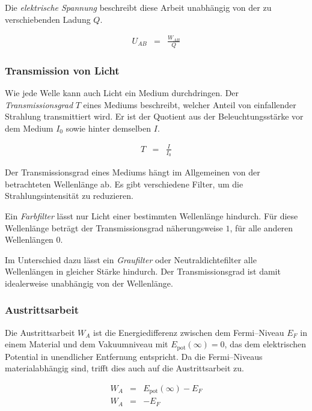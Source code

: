 \documentclass[12pt,a4paper]{scrartcl}
\numberwithin{equation}{section} %
\begin{document}
Die \emph{elektrische Spannung} beschreibt diese Arbeit unabhängig von der zu verschiebenden Ladung $Q$. \cite{Gerthsen}

\begin{eqnarray}
	U_{AB} &=& \frac{W_{AB}}{Q}
\end{eqnarray}

\subsubsection{Transmission von Licht}
Wie jede Welle kann auch Licht ein Medium durchdringen. Der \emph{Transmissionsgrad} $T$ eines Mediums beschreibt, welcher Anteil von einfallender Strahlung transmittiert wird. Er ist der Quotient aus der Beleuchtungsstärke vor dem Medium $I_0$ sowie hinter demselben $I$. \cite{Gerthsen}

\begin{eqnarray}
	T &=& \frac{I}{I_0}
\end{eqnarray}

\noindent
Der Transmissionsgrad eines Mediums hängt im Allgemeinen von der betrachteten Wellenlänge ab. Es gibt verschiedene Filter, um die Strahlungsintensität zu reduzieren.

Ein \emph{Farbfilter} lässt nur Licht einer bestimmten Wellenlänge hindurch. Für diese Wellenlänge beträgt der Transmissionsgrad näherungsweise $1$, für alle anderen Wellenlängen $0$. %

Im Unterschied dazu lässt ein \emph{Graufilter} oder Neutraldichtefilter alle Wellenlängen in gleicher Stärke hindurch. Der Transmissionsgrad ist damit idealerweise unabhängig von der Wellenlänge. %

\subsubsection{Austrittsarbeit}
Die Austrittsarbeit $W_A$ ist die Energiedifferenz zwischen dem Fermi--Niveau $E_F$ in einem Material und dem Vakuumniveau mit $E_\mathrm{pot}(\infty)=0$, das dem elektrischen Potential in unendlicher Entfernung entspricht. Da die Fermi--Niveaus materialabhängig sind, trifft dies auch auf die Austrittsarbeit zu. \cite{Demtröder}

\begin{eqnarray}
	W_A &=& E_\mathrm{pot}(\infty) - E_F \\
	W_A &=& -E_F
\end{eqnarray}
\end{document}
